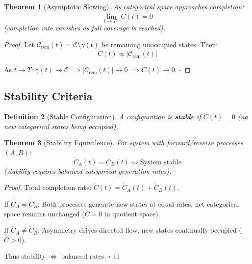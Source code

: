 \documentclass[12pt,a4paper]{article}
\newtheorem{theorem}{Theorem}[section]
\newtheorem{definition}[theorem]{Definition}
\begin{document}
\begin{theorem}[Asymptotic Slowing]
\label{thm:asymptotic_slowing}
As categorical space approaches completion:
\begin{equation}
\lim_{t \to T^-} \dot{C}(t) = 0
\end{equation}
(completion rate vanishes as full coverage is reached).
\end{theorem}

\begin{proof}
Let $\mathcal{C}_{\text{rem}}(t) = \mathcal{C} \setminus \gamma(t)$ be remaining unoccupied states. Then:
\begin{equation}
\dot{C}(t) \propto |\mathcal{C}_{\text{rem}}(t)|
\end{equation}

As $t \to T$: $\gamma(t) \to \mathcal{C} \implies |\mathcal{C}_{\text{rem}}(t)| \to 0 \implies \dot{C}(t) \to 0$. $\square$
\end{proof}

\subsection{Stability Criteria}

\begin{definition}[Stable Configuration]
\label{def:stable_configuration}
A configuration is \textbf{stable} if $\dot{C}(t) = 0$ (no new categorical states being occupied).
\end{definition}

\begin{theorem}[Stability Equivalence]
\label{thm:stability_equivalence}
For system with forward/reverse processes $(A, B)$:
\begin{equation}
\dot{C}_A(t) = \dot{C}_B(t) \iff \text{System stable}
\end{equation}
(stability requires balanced categorical generation rates).
\end{theorem}

\begin{proof}
Total completion rate: $\dot{C}(t) = \dot{C}_A(t) + \dot{C}_B(t)$.

If $\dot{C}_A = \dot{C}_B$: Both processes generate new states at equal rates, net categorical space remains unchanged ($\dot{C} = 0$ in quotient space).

If $\dot{C}_A \neq \dot{C}_B$: Asymmetry drives directed flow, new states continually occupied ($\dot{C} > 0$).

Thus stability $\iff$ balanced rates. $\square$
\end{proof}
\end{document}
